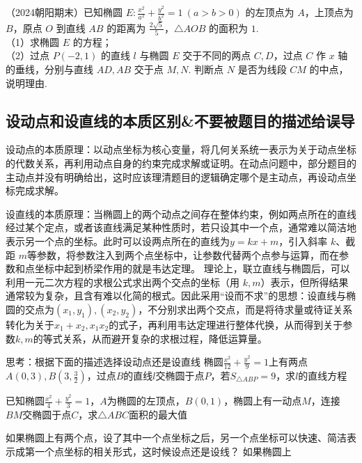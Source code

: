 \begin{example} %
（2024朝阳期末）已知椭圆 $E:\frac{x^2}{a^2}+\frac{y^2}{b^2}=1\ (a>b>0)$ 的左顶点为 $A$，上顶点为 $B$，原点 $O$ 到直线 $AB$ 的距离为 $\frac{2\sqrt{5}}{5}$，$\triangle AOB$ 的面积为 $1$.\\
（1）求椭圆 $E$ 的方程；\\
（2）过点 $P(-2,1)$ 的直线 $l$ 与椭圆 $E$ 交于不同的两点 $C,D$，过点 $C$ 作 $x$ 轴的垂线，分别与直线 $AD,AB$ 交于点 $M,N$. 判断点 $N$ 是否为线段 $CM$ 的中点，说明理由.
\end{example}
\begin{property}
\vspace*{15\baselineskip}
\end{property}



\subsection{设动点和设直线的本质区别\&不要被题目的描述给误导}

设动点的本质原理：以动点坐标为核心变量，将几何关系统一表示为关于动点坐标的代数关系，再利用动点自身的约束完成求解或证明。在动点问题中，部分题目的主动点并没有明确给出，这时应该理清题目的逻辑确定哪个是主动点，再设动点坐标完成求解。

设直线的本质原理：当椭圆上的两个动点之间存在整体约束，例如两点所在的直线经过某个定点，或者该直线满足某种性质时，若只设其中一个点，通常难以简洁地表示另一个点的坐标。此时可以设两点所在的直线为$y=kx+m$，引入斜率 $k$、截距 $m$等参数，将参数注入到两个点坐标中，让参数代替两个点参与运算，而在参数和点坐标中起到桥梁作用的就是韦达定理。
理论上，联立直线与椭圆后，可以利用一元二次方程的求根公式求出两个交点的坐标（用 $k,m$）表示，但所得结果通常较为复杂，且含有难以化简的根式。因此采用“设而不求”的思想：设直线与椭圆的交点为$(x_1, y_1), (x_2, y_2)$，不分别求出两个交点，而是将待求量或待证关系转化为关于$x_1+x_2,x_1x_2$的式子，再利用韦达定理进行整体代换，从而得到关于参数$k, m$的等式关系，从而避开复杂的求根过程，降低运算量。

思考：根据下面的描述选择设动点还是设直线
椭圆$\frac{x^2}{12} + \frac{y^2}{9} = 1$上有两点$A(0, 3), B(3, \frac{3}{2})$，过点$B$的直线$l$交椭圆于点$P$，若$S_{\triangle ABP} = 9$，求$l$的直线方程

已知椭圆$\frac{x^2}{4} + \frac{y^2}{3} = 1$，$A$为椭圆的左顶点，$B(0, 1)$，椭圆上有一动点$M$，连接$BM$交椭圆于点$C$，求$\triangle ABC$面积的最大值


如果椭圆上有两个点，设了其中一个点坐标之后，另一个点坐标可以快速、简洁表示成第一个点坐标的相关形式，这时候设点还是设线？
如果椭圆上


